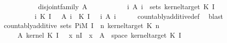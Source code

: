 \begin{isabellebody}
\ \ \ \ \ \ \ \ \ \ \ disjoint{\isacharunderscore}{\kern0pt}family\ A{\isacharsemicolon}{\kern0pt}\isanewline
\ \ \ \ \ \ \ \ \ \ \ {\isacharparenleft}{\kern0pt}{\isasymUnion}i{\isachardot}{\kern0pt}\ A\ i{\isacharparenright}{\kern0pt}\ {\isasymin}\ {\isacharparenleft}{\kern0pt}sets\ {\isacharparenleft}{\kern0pt}kernel{\isacharunderscore}{\kern0pt}target\ {\isacharparenleft}{\kern0pt}K\ {\isacharparenleft}{\kern0pt}I\ {}{\isacharparenright}{\kern0pt}{\isacharparenright}{\kern0pt}{\isacharparenright}{\kern0pt}{\isacharparenright}{\kern0pt}{\isasymrbrakk}\ {\isasymLongrightarrow}\isanewline
\ \ \ \ \ \ \ \ \ \ {\isacharparenleft}{\kern0pt}{\isasymSum}i{\isachardot}{\kern0pt}\ {\isacharparenleft}{\kern0pt}K\ {\isacharparenleft}{\kern0pt}I\ {}{\isacharparenright}{\kern0pt}\ {\isasymomega}{\isacharparenright}{\kern0pt}\ {\isacharparenleft}{\kern0pt}A\ i{\isacharparenright}{\kern0pt}{\isacharparenright}{\kern0pt}\ {\isacharequal}{\kern0pt}\ {\isacharparenleft}{\kern0pt}K\ {\isacharparenleft}{\kern0pt}I\ {}{\isacharparenright}{\kern0pt}\ {\isasymomega}{\isacharparenright}{\kern0pt}\ {\isacharparenleft}{\kern0pt}{\isasymUnion}i{\isachardot}{\kern0pt}\ A\ i{\isacharparenright}{\kern0pt}{\isachardoublequoteclose}\isanewline
\ \ \ \ \isamarkupfalse%
\ countably{\isacharunderscore}{\kern0pt}additive{\isacharunderscore}{\kern0pt}def\ \isamarkupfalse%
\ blast\isanewline
\ \ \isamarkupfalse%
\ {\isachardoublequoteopen}countably{\isacharunderscore}{\kern0pt}additive\ {\isacharparenleft}{\kern0pt}sets\ {\isacharparenleft}{\kern0pt}Pi\isactrlsub M\ {\isacharbraceleft}{\kern0pt}I\ {}{\isacharbraceright}{\kern0pt}\ {\isacharparenleft}{\kern0pt}{\isasymlambda}n{\isachardot}{\kern0pt}\ kernel{\isacharunderscore}{\kern0pt}target\ {\isacharparenleft}{\kern0pt}K\ n{\isacharparenright}{\kern0pt}{\isacharparenright}{\kern0pt}{\isacharparenright}{\kern0pt}{\isacharparenright}{\kern0pt}\isanewline
\ \ \ \ \ {\isacharparenleft}{\kern0pt}{\isasymlambda}A{\isacharprime}{\kern0pt}{\isachardot}{\kern0pt}\ kernel\ {\isacharparenleft}{\kern0pt}K\ {\isacharparenleft}{\kern0pt}I\ {}{\isacharparenright}{\kern0pt}{\isacharparenright}{\kern0pt}\ {\isasymomega}\ {\isacharparenleft}{\kern0pt}{\isacharparenleft}{\kern0pt}{\isasymlambda}x{\isachardot}{\kern0pt}\ {\isasymlambda}n{\isasymin}{\isacharbraceleft}{\kern0pt}I\ {}{\isacharbraceright}{\kern0pt}{\isachardot}{\kern0pt}\ x{\isacharparenright}{\kern0pt}\ {\isacharminus}{\kern0pt}{\isacharbackquote}{\kern0pt}\ A{\isacharprime}{\kern0pt}\ {\isasyminter}\ space\ {\isacharparenleft}{\kern0pt}kernel{\isacharunderscore}{\kern0pt}target\ {\isacharparenleft}{\kern0pt}K\ {\isacharparenleft}{\kern0pt}I\ {}{\isacharparenright}{\kern0pt}{\isacharparenright}{\kern0pt}{\isacharparenright}{\kern0pt}{\isacharparenright}{\kern0pt}{\isacharparenright}{\kern0pt}{\isachardoublequoteclose}\isanewline

\end{isabellebody}
